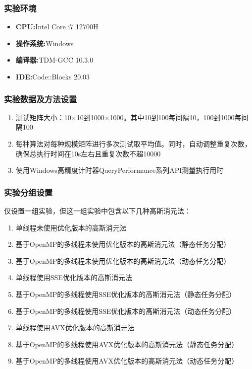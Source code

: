 \documentclass{nku}
\begin{document}
\subsubsection{实验环境}
\begin{itemize}
    \item \textbf{CPU:}Intel Core i7 12700H
    \item \textbf{操作系统:}Windows
    \item \textbf{编译器:}TDM-GCC 10.3.0
    \item \textbf{IDE:}Code::Blocks 20.03
\end{itemize}

\subsubsection{实验数据及方法设置}
\begin{enumerate}[label=\arabic*.]
    \item 测试矩阵大小：10$\times$10到1000$\times$1000。其中10到100每间隔10，100到1000每间隔100
    \item 每种算法对每种规模矩阵进行多次测试取平均值。同时，自动调整重复次数，确保总执行时间在10s左右且重复次数不超10000
    \item 使用Windows高精度计时器QueryPerformance系列API测量执行用时
\end{enumerate}

\subsubsection{实验分组设置}
仅设置一组实验，但这一组实验中包含以下几种高斯消元法：
\begin{enumerate}
    \item 单线程未使用优化版本的高斯消元法
    \item 基于OpenMP的多线程未使用优化版本的高斯消元法（静态任务分配）
    \item 基于OpenMP的多线程未使用优化版本的高斯消元法（动态任务分配）
    \item 单线程使用SSE优化版本的高斯消元法
    \item 基于OpenMP的多线程使用SSE优化版本的高斯消元法（静态任务分配）
    \item 基于OpenMP的多线程使用SSE优化版本的高斯消元法（动态任务分配）
    \item 单线程使用AVX优化版本的高斯消元法
    \item 基于OpenMP的多线程使用AVX优化版本的高斯消元法（静态任务分配）
    \item 基于OpenMP的多线程使用AVX优化版本的高斯消元法（动态任务分配）
\end{enumerate}
\end{document}
